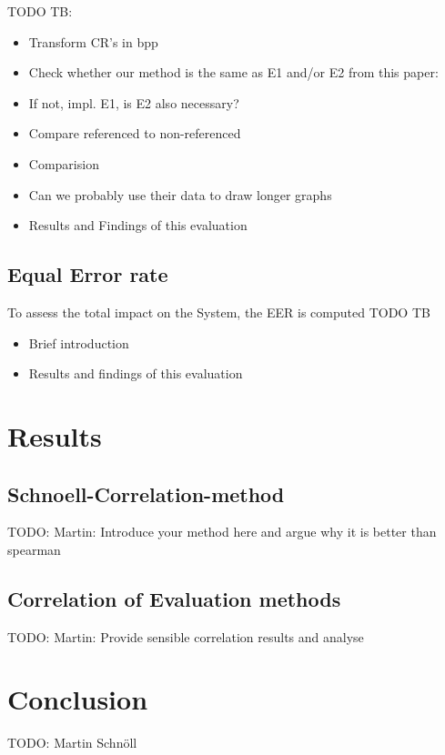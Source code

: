 \documentclass[10pt,twocolumn,letterpaper]{article}
\begin{document}
TODO TB:
\begin{itemize}
 \item Transform CR's in bpp
 \item Check whether our method is the same as E1 and/or E2 from this paper: \cite{severeCompression}
 \item If not, impl. E1, is E2 also necessary?
 \item Compare referenced to non-referenced
 \item Comparision
 \item Can we probably use their data to draw longer graphs
 \item Results and Findings of this evaluation
\end{itemize}


\subsection{Equal Error rate}
To assess the total impact on the System, the EER is computed
TODO TB

\begin{itemize}
 \item Brief introduction
 \item Results and findings of this evaluation
\end{itemize}


\section{Results}
\subsection{Schnoell-Correlation-method}
TODO: Martin: Introduce your method here and argue why it is better than spearman

\subsection{Correlation of Evaluation methods}
TODO: Martin:
Provide sensible correlation results and analyse


\section{Conclusion}
TODO: Martin Schnöll


{\small


}
\end{document}
